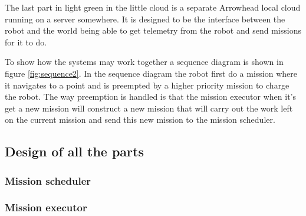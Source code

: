 \documentclass[main.tex]{subfiles}
\begin{document}
The last part in light green in the little cloud is a separate Arrowhead local cloud running on a server somewhere. It is designed to be the interface between the robot and the world being able to get telemetry from the robot and send missions for it to do.



To show how the systems may work together a sequence diagram is shown in figure \ref{fig:sequence2}.
In the sequence diagram the robot first do a mission where it navigates to a point and is preempted by a higher priority mission to charge the robot.
The way preemption is handled is that the mission executor when it's get a new mission will construct a new mission that will carry out the work left on the current mission and send this new mission to the mission scheduler.

\subsection{Design of all the parts}

\subsubsection{Mission scheduler}

\subsubsection{Mission executor}
\label{sec:mission_executor}
\end{document}
